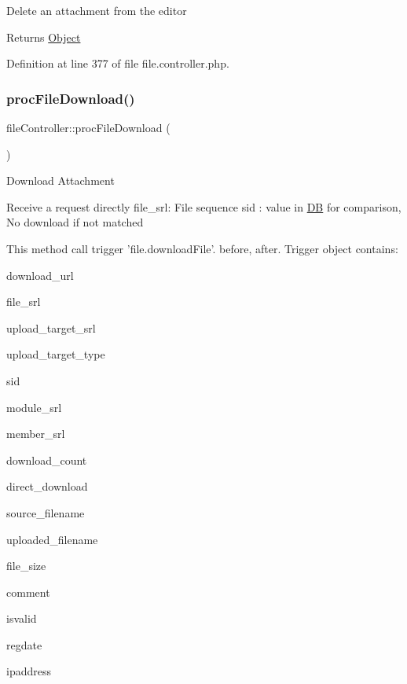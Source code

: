 Delete an attachment from the editor

\begin{DoxyReturn}{Returns}
\hyperlink{classObject}{Object} 
\end{DoxyReturn}


Definition at line 377 of file file.\+controller.\+php.

\hypertarget{classfileController_a11ac8c819e791e103ed113b3927975af}{}\label{classfileController_a11ac8c819e791e103ed113b3927975af} 
\subsubsection{\texorpdfstring{proc\+File\+Download()}{procFileDownload()}}
{\footnotesize\ttfamily file\+Controller\+::proc\+File\+Download (\begin{DoxyParamCaption}{ }\end{DoxyParamCaption})}

Download Attachment


\begin{DoxyPre}
Receive a request directly
file\_srl: File sequence
sid : value in \hyperlink{classDB}{DB} for comparison, No download if not matched\end{DoxyPre}



\begin{DoxyPre}This method call trigger 'file.downloadFile'.
before, after.
Trigger object contains:
\begin{DoxyItemize}
\item download\_url
\item file\_srl
\item upload\_target\_srl
\item upload\_target\_type
\item sid
\item module\_srl
\item member\_srl
\item download\_count
\item direct\_download
\item source\_filename
\item uploaded\_filename
\item file\_size
\item comment
\item isvalid
\item regdate
\item ipaddress

\end{DoxyItemize}\end{DoxyPre}




